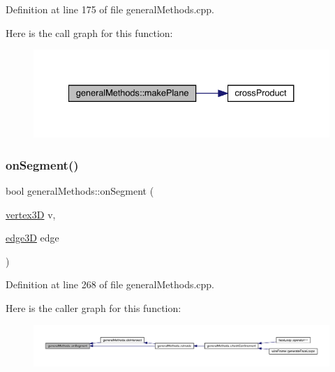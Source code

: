 Definition at line 175 of file general\+Methods.\+cpp.

Here is the call graph for this function\+:
\nopagebreak
\begin{figure}[H]
\begin{center}
\leavevmode
\includegraphics[width=334pt]{namespacegeneral_methods_a06d99f1b292d29dbdbe4734847c8d2ee_cgraph}
\end{center}
\end{figure}
\mbox{\label{namespacegeneral_methods_a557bf2257d6658862b42124035aa9588}} 
\subsubsection{\texorpdfstring{on\+Segment()}{onSegment()}}
{\footnotesize\ttfamily bool general\+Methods\+::on\+Segment (\begin{DoxyParamCaption}\item[{\mbox{\hyperlink{structvertex3_d}{vertex3D}}}]{v,  }\item[{\mbox{\hyperlink{structedge3_d}{edge3D}}}]{edge }\end{DoxyParamCaption})}



Definition at line 268 of file general\+Methods.\+cpp.

Here is the caller graph for this function\+:
\nopagebreak
\begin{figure}[H]
\begin{center}
\leavevmode
\includegraphics[width=350pt]{namespacegeneral_methods_a557bf2257d6658862b42124035aa9588_icgraph}
\end{center}
\end{figure}
\mbox{\label{namespacegeneral_methods_a7bfbfb2a02328d76e70f66fedd57c4ef}} 
